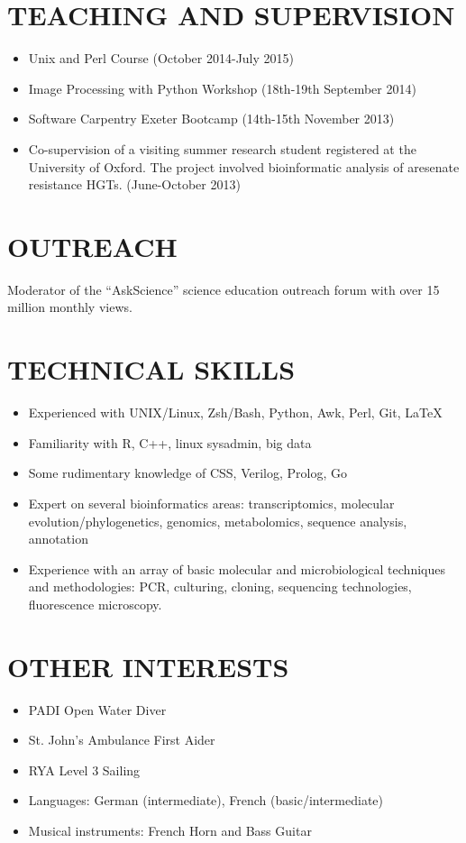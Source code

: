 \documentclass{res}
\begin{document}
\begin{resume}
  \section{TEACHING AND SUPERVISION}
  \begin{itemize}
      \item Unix and Perl Course (October 2014-July 2015)
      \item Image Processing with Python Workshop (18th-19th September 2014)
      \item Software Carpentry Exeter Bootcamp (14th-15th November 2013)
      \item Co-supervision of a visiting summer research student registered at the University of Oxford. The project involved bioinformatic analysis of aresenate resistance HGTs. (June-October 2013)
  \end{itemize}
 \section{OUTREACH}          
Moderator of the ``AskScience'' science education outreach forum with over 15 million monthly views.
 \section{TECHNICAL SKILLS}
 \begin{itemize}
\item Experienced with UNIX/Linux, Zsh/Bash, Python, Awk, Perl, Git, \LaTeX
\item Familiarity with R, C++, linux sysadmin, big data
\item Some rudimentary knowledge of CSS, Verilog, Prolog, Go
\item Expert on several bioinformatics areas: transcriptomics, molecular evolution/phylogenetics, genomics, metabolomics, sequence analysis, annotation
\item Experience with an array of basic molecular and microbiological techniques and methodologies: PCR, culturing, cloning, sequencing technologies, fluorescence microscopy.
    \end{itemize}
	
 \section{OTHER INTERESTS}
 \begin{itemize}
     \item PADI Open Water Diver
     \item St. John's Ambulance First Aider
     \item RYA Level 3 Sailing
     \item Languages: German (intermediate), French (basic/intermediate)
     \item Musical instruments: French Horn and Bass Guitar
 \end{itemize}
\end{resume}
\end{document}
